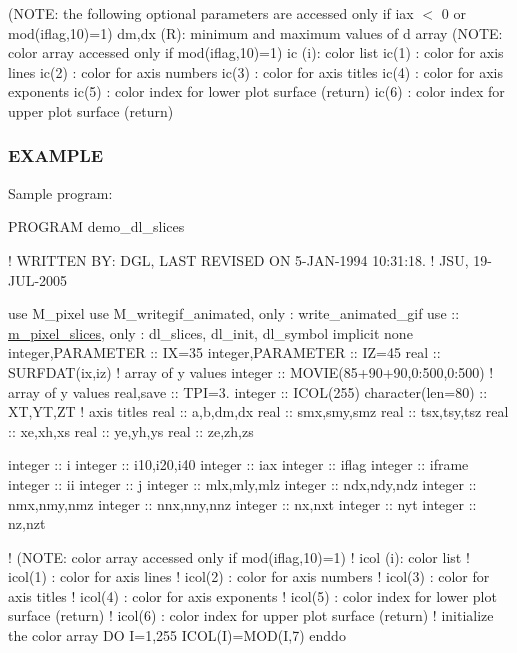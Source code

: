 (N\+O\+TE\+: the following optional parameters are accessed only if iax $<$ 0 or mod(iflag,10)=1) dm,dx (R)\+: minimum and maximum values of d array (N\+O\+TE\+: color array accessed only if mod(iflag,10)=1) ic (i)\+: color list ic(1) \+: color for axis lines ic(2) \+: color for axis numbers ic(3) \+: color for axis titles ic(4) \+: color for axis exponents ic(5) \+: color index for lower plot surface (return) ic(6) \+: color index for upper plot surface (return)

\subsubsection*{E\+X\+A\+M\+P\+LE}

Sample program\+:

P\+R\+O\+G\+R\+AM demo\+\_\+dl\+\_\+slices

! W\+R\+I\+T\+T\+EN BY\+: D\+GL, L\+A\+ST R\+E\+V\+I\+S\+ED ON 5-\/\+J\+A\+N-\/1994 10\+:31\+:18. ! J\+SU, 19-\/\+J\+U\+L-\/2005

use M\+\_\+pixel use M\+\_\+writegif\+\_\+animated, only \+: write\+\_\+animated\+\_\+gif use \+:\+: \hyperlink{namespacem__pixel__slices}{m\+\_\+pixel\+\_\+slices}, only \+: dl\+\_\+slices, dl\+\_\+init, dl\+\_\+symbol implicit none integer,P\+A\+R\+A\+M\+E\+T\+ER \+:\+: IX=35 integer,P\+A\+R\+A\+M\+E\+T\+ER \+:\+: IZ=45 real \+:\+: S\+U\+R\+F\+D\+A\+T(ix,iz) ! array of y values integer \+:\+: M\+O\+V\+IE(85+90+90,0\+:500,0\+:500) ! array of y values real,save \+:\+: T\+PI=3. integer \+:\+: I\+C\+O\+L(255) character(len=80) \+:\+: XT,YT,ZT ! axis titles real \+:\+: a,b,dm,dx real \+:\+: smx,smy,smz real \+:\+: tsx,tsy,tsz real \+:\+: xe,xh,xs real \+:\+: ye,yh,ys real \+:\+: ze,zh,zs

integer \+:\+: i integer \+:\+: i10,i20,i40 integer \+:\+: iax integer \+:\+: iflag integer \+:\+: iframe integer \+:\+: ii integer \+:\+: j integer \+:\+: mlx,mly,mlz integer \+:\+: ndx,ndy,ndz integer \+:\+: nmx,nmy,nmz integer \+:\+: nnx,nny,nnz integer \+:\+: nx,nxt integer \+:\+: nyt integer \+:\+: nz,nzt

! (N\+O\+TE\+: color array accessed only if mod(iflag,10)=1) ! icol (i)\+: color list ! icol(1) \+: color for axis lines ! icol(2) \+: color for axis numbers ! icol(3) \+: color for axis titles ! icol(4) \+: color for axis exponents ! icol(5) \+: color index for lower plot surface (return) ! icol(6) \+: color index for upper plot surface (return) ! initialize the color array DO I=1,255 I\+C\+O\+L(\+I)=M\+O\+D(\+I,7) enddo

